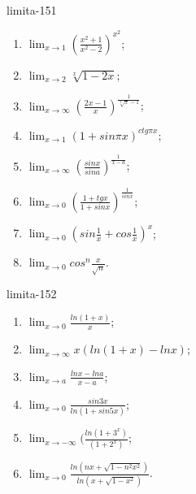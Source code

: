 \begin{defproblem}{limita-151}
\begin{multicols}{2}
\begin{enumerate}
    \item $\lim_{{x \rightarrow 1}} (\frac{x^2+1}{x^2-2})^{x^2}$;
    \item $\lim_{{x \rightarrow 2}} \sqrt[x]{1-2x}$;
    \item $\lim_{{x \rightarrow \infty}} (\frac{2x-1}{x})^{\frac{1}{\sqrt[3]{x}-1}}$;
    \item $\lim_{{x \rightarrow 1}} (1+sin \pi x)^{ctg \pi x}$;
    \item $\lim_{{x \rightarrow \infty}} (\frac{sin x}{sin a})^{\frac{1}{x-a}}$;
    \item $\lim_{{x \rightarrow 0}} (\frac{1+tg x}{1+sin x})^{\frac{1}{sin x}}$;
    \item $\lim_{{x \rightarrow 0}} (sin \frac{1}{x}+cos \frac{1}{x})^x$;
    \item $\lim_{{x \rightarrow 0}} cos ^n \frac{x}{\sqrt{n}}$.
\end{enumerate}
\end{multicols}
\end{defproblem}

\begin{defproblem}{limita-152}
\begin{multicols}{2}
\begin{enumerate}
    \item $\lim_{{x \rightarrow 0}} \frac{ln(1+x)}{x}$;
    \item $\lim_{{x \rightarrow \infty}} x(ln(1+x)-ln x)$;
    \item $\lim_{{x \rightarrow a}} \frac{ln x - ln a}{x-a}$;
    \item $\lim_{{x \rightarrow 0}} \frac{sin 3x}{ln(1+sin 5x)}$;
    \item $\lim_{{x \rightarrow -\infty}} (\frac{ln (1+3^x)}{(1+2^x)}$;
    \item $\lim_{{x \rightarrow 0}} \frac{ln(nx+\sqrt{1-n^2x^2})}{ln(x+\sqrt{1-x^2})}$.
\end{enumerate}
\end{multicols}
\end{defproblem}

